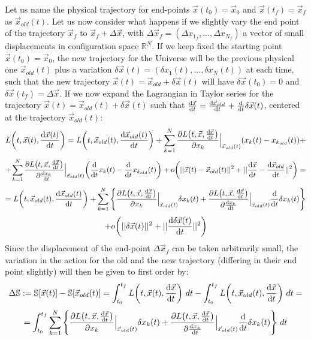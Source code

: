 \documentclass[11pt, a4paper]{article} %
\newcommand{\R}{\mathbb{R}} %
\newcommand{\s}{\mathbb{S}}
\begin{document}
Let us name the physical trajectory for end-points $\vec{x}(t_0)=\vec{x}_0$ and $\vec{x}(t_f)=\vec{x}_f$ as $\vec{x}_{old}(t)$. Let us now consider what happens if we slightly vary the end point of the trajectory $\vec{x}_f$ to $\vec{x}_f+\Delta\vec{x}$, with $\Delta\vec{x}_f=(\Delta x_{1_f}, ..., \Delta x_{N_f})$ a vector of small displacements in configuration space $\R^N$. If we keep fixed the starting point $\vec{x}(t_0)=\vec{x}_0$, the new trajectory for the Universe will be the previous physical one $\vec{x}_{old}(t)$ plus a variation $\delta \vec{x}(t)=(\delta x_1(t),...,\delta x_N(t))$ at each time, such that the new trajectory $\vec{x}(t)=\vec{x}_{old}+\delta \vec{x}(t)$ will have $\delta \vec{x}(t_0)=0$ and $\delta \vec{x}(t_f)=\Delta\vec{x}$. If we now expand the Lagrangian in Taylor series for the trajectory $\vec{x}(t)=\vec{x}_{old}(t)+\delta\vec{x}(t)$ such that $\dv{\vec{x}}{t}(t)=\dv{\vec{x}_{old}}{t} (t)+\dv{}{t}\delta \vec{x}(t)$, centered at the trajectory $\vec{x}_{old}(t)$:
\begin{equation}
L\qty(t, \vec{x}(t), \dv{\vec{x}(t)}{t})=L\qty(t, \vec{x}_{old}(t), \dv{\vec{x}_{old}(t)}{t})+\sum_{k=1}^N \pdv{L\qty(t, \vec{x}, \dv{\vec{x}}{t})}{x_k}\Big\rvert_{\vec{x}_{old}(t)}\qty(x_k(t)-x_{k_{old}}(t))+
\end{equation}
$$
+\sum_{k=1}^N \pdv{L\qty(t, \vec{x}, \dv{\vec{x}}{t})}{\dv{x_k}{t}}\Big\rvert_{\vec{x}_{old} (t)}\qty(\dv{}{t}x_k(t)-\dv{}{t}x_{k_{old}}(t))+
o\qty(||\vec{x}(t)-\vec{x}_{old}(t)||^2+||\dv{\vec{x}}{t} (t)-\dv{\vec{x}_{old}}{t} (t) ||^2)=
$$
$$
=L\qty(t, \vec{x}_{old}(t), \dv{\vec{x}_{old}(t)}{t})+\sum_{k=1}^N \qty{\pdv{L\qty(t, \vec{x}, \dv{\vec{x}}{t})}{x_k}\Big\rvert_{\vec{x}_{old}(t)}\delta x_k(t)+\pdv{L\qty(t, \vec{x}, \dv{\vec{x}}{t})}{\dv{x_k}{t}}\Big\rvert_{\vec{x}_{old}(t)}\dv{}{t}\delta x_k(t)}
$$
$$
+o\qty(||\delta\vec{x}(t)||^2+||\dv{\delta \vec{x}(t)}{t}||^2)
$$
Since the displacement of the end-point $\Delta \vec{x}_f$ can be taken arbitrarily small, the variation in the action for the old and the new trajectory (differing in their end point slightly) will then be given to first order by:
\begin{equation}
\Delta \s:=\s[\vec{x}(t)]-\s[\vec{x}_{old}(t)]=\int_{t_0}^{t_f} L\qty(t, \vec{x}(t), \dv{\vec{x}}{t})\ dt - \int_{t_0}^{t_f} L\qty(t, \vec{x}_{old}(t), \dv{\vec{x}}{t})\ dt=
\end{equation}
$$
= \int_{t_0}^{t_f}  \sum_{k=1}^N \qty{\pdv{L\qty(t, \vec{x}, \dv{\vec{x}}{t})}{x_k}\Big\rvert_{\vec{x}_{old}(t)}\delta x_k(t)+\pdv{L\qty(t, \vec{x}, \dv{\vec{x}}{t})}{\dv{x_k}{t}}\Big\rvert_{\vec{x}_{old}(t)}\dv{}{t}\delta x_k(t)}
\ dt
$$
\end{document}

